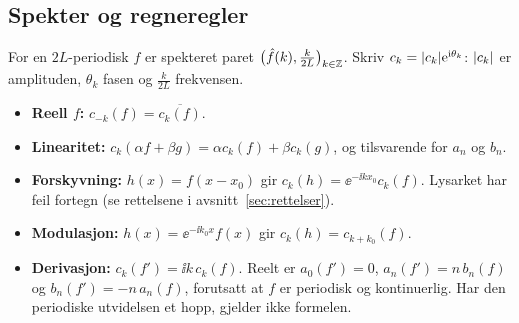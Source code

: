 \subsection{Spekter og regneregler}
\begin{defn}
For en $2L$-periodisk $f$ er spekteret paret $\bigl(\hat f(k),\frac k{2L}\bigr)_{k\in\mathbb{Z}}$. Skriv $c_k=\lvert c_k\rvert\mathrm{e}^{\mathrm{i}\theta_k}$: $\lvert c_k\rvert$ er amplituden, $\theta_k$ fasen og $\frac k{2L}$ frekvensen.
\end{defn}
\begin{teorem}
\begin{itemize}
  \item \textbf{Reell $f$:} $c_{-k}(f)=\overline{c_k(f)}$.
  \item \textbf{Linearitet:} $c_k(\alpha f+\beta g)=\alpha c_k(f)+\beta c_k(g)$, og tilsvarende for $a_n$ og $b_n$.
  \item \textbf{Forskyvning:} $h(x)=f(x-x_0)$ gir $c_k(h)=\ee^{-\ii kx_0}c_k(f)$. Lysarket har feil fortegn (se rettelsene i avsnitt~\ref{sec:rettelser}).
  \item \textbf{Modulasjon:} $h(x)=\ee^{-\ii k_0x}f(x)$ gir $c_k(h)=c_{k+k_0}(f)$.
  \item \textbf{Derivasjon:} $c_k(f')=\ii k\,c_k(f)$. Reelt er $a_0(f')=0$, $a_n(f')=n\,b_n(f)$ og $b_n(f')=-n\,a_n(f)$, forutsatt at $f$ er periodisk og kontinuerlig. Har den periodiske utvidelsen et hopp, gjelder ikke formelen.
\end{itemize}
\end{teorem}


